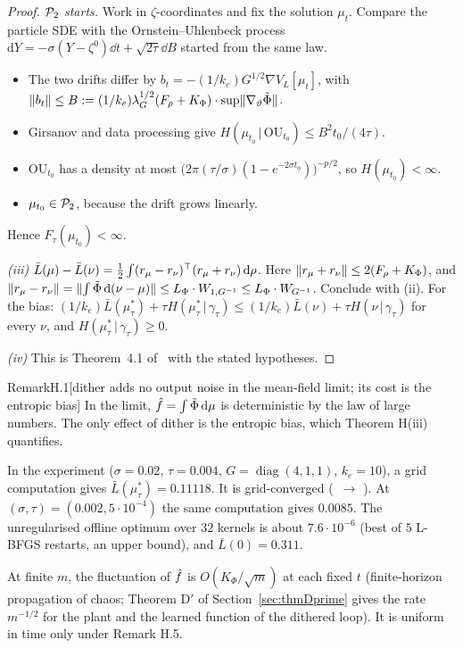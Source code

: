 \begin{proof}
\emph{$\mathcal{P}_2$ starts.} Work in $\zeta$-coordinates and fix the solution $\mu_t$. Compare the particle SDE with the
Ornstein--Uhlenbeck process $\mathrm{d}Y = -\sigma(Y - \zeta^0)\dd t + \sqrt{2\tau}\dd B$ started from the same law.
\begin{itemize}
  \item The two drifts differ by $b_t = -(1/k_e)G^{1/2}\nabla V_L[\mu_t]$, with
  $\lVert b_t\rVert \le B := (1/k_e)\lambda_G^{1/2}(F_\rho + K_\Phi)\cdot\sup\lVert \nabla_\vartheta\tilde\Phi\rVert$.
  \item Girsanov and data processing give $H(\mu_{t_0}\,|\,\mathrm{OU}_{t_0}) \le B^2 t_0/(4\tau)$.
  \item $\mathrm{OU}_{t_0}$ has a density at most
  $\bigl(2\pi(\tau/\sigma)(1 - e^{-2\sigma t_0})\bigr)^{-p/2}$, so $H(\mu_{t_0}) < \infty$.
  \item $\mu_{t_0} \in \mathcal{P}_2$, because the drift grows linearly.
\end{itemize}
Hence $F_\tau(\mu_{t_0}) < \infty$.

\smallskip
\emph{(iii)} $\bar L(\mu) - \bar L(\nu) = \frac12\int(r_\mu - r_\nu)^\top(r_\mu + r_\nu)\,\mathrm{d}\rho$. Here
$\lVert r_\mu + r_\nu\rVert \le 2(F_\rho + K_\Phi)$, and
$\lVert r_\mu - r_\nu\rVert = \lVert \int\tilde\Phi\,\mathrm{d}(\nu - \mu)\rVert \le L_\Phi\cdot W_{1,G^{-1}} \le L_\Phi\cdot W_{G^{-1}}$. Conclude
with (ii). For the bias:
$(1/k_e)\bar L(\mu^*_\tau) + \tau H(\mu^*_\tau\,|\,\gamma_\tau) \le (1/k_e)\bar L(\nu) + \tau H(\nu\,|\,\gamma_\tau)$
for every $\nu$, and $H(\mu^*_\tau\,|\,\gamma_\tau) \ge 0$.

\smallskip
\emph{(iv)} This is Theorem~4.1 of~\cite{S3} with the stated hypotheses.
\end{proof}

\begin{rmk}{Remark}{H.1}[dither adds no output noise in the mean-field limit; its cost is the entropic bias]
In the limit, $\hat f = \int\tilde\Phi\,\mathrm{d}\mu$ is deterministic by the law of large numbers. The only effect of dither
is the entropic bias, which Theorem H(iii) quantifies.

In the experiment ($\sigma = 0.02$, $\tau = 0.004$, $G = \operatorname{diag}(4,1,1)$, $k_e = 10$), a grid computation
gives $\bar L(\mu^*_\tau) = 0.11118$. It is grid-converged (~$\to$
). At $(\sigma, \tau) = (0.002, 5\cdot 10^{-4})$ the same computation
gives $0.0085$. The unregularised offline optimum over $32$ kernels is about $7.6\cdot 10^{-6}$ (best of $5$ L-BFGS
restarts, an upper bound), and $\bar L(0) = 0.311$.

At finite $m$, the fluctuation of $\hat f$ is $O(K_\Phi/\sqrt{m})$ at each fixed $t$ (finite-horizon propagation of
chaos; Theorem D$'$ of Section~\ref{sec:thmDprime} gives the rate $m^{-1/2}$ for the plant and the learned function
of the dithered loop). It is uniform in time only under Remark H.5.
\end{rmk}

